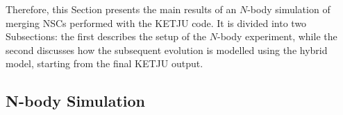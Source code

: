 \documentclass[12pt,twoside,openany]{book}
\begin{document}
Therefore, this Section presents the main results of an $N$-body simulation of merging NSCs performed with the KETJU code. It is divided into two Subsections: the first describes the setup of the $N$-body experiment, while the second discusses how the subsequent evolution is modelled using the hybrid model, starting from the final KETJU output.

















\subsection{N-body Simulation}
\end{document}
